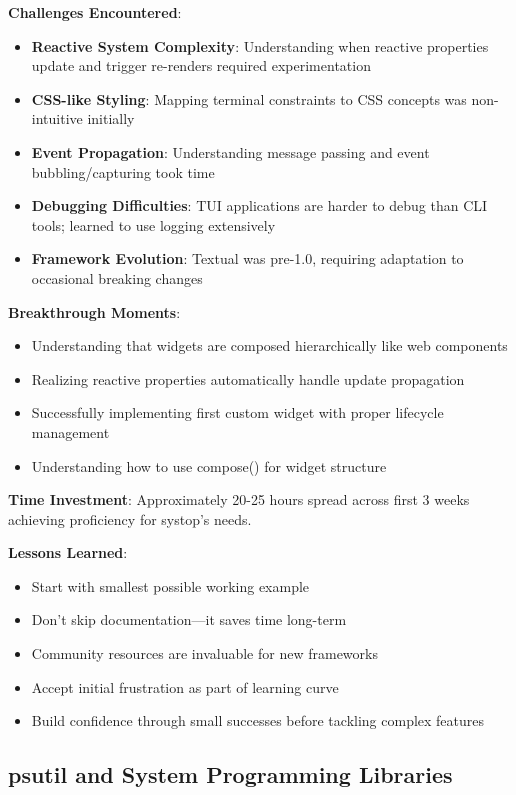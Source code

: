 \documentclass[12pt,a4paper,oneside]{report}
\begin{document}
\textbf{Challenges Encountered}:
\begin{itemize}
    \item \textbf{Reactive System Complexity}: Understanding when reactive properties update and trigger re-renders required experimentation
    \item \textbf{CSS-like Styling}: Mapping terminal constraints to CSS concepts was non-intuitive initially
    \item \textbf{Event Propagation}: Understanding message passing and event bubbling/capturing took time
    \item \textbf{Debugging Difficulties}: TUI applications are harder to debug than CLI tools; learned to use logging extensively
    \item \textbf{Framework Evolution}: Textual was pre-1.0, requiring adaptation to occasional breaking changes
\end{itemize}

\textbf{Breakthrough Moments}:
\begin{itemize}
    \item Understanding that widgets are composed hierarchically like web components
    \item Realizing reactive properties automatically handle update propagation
    \item Successfully implementing first custom widget with proper lifecycle management
    \item Understanding how to use compose() for widget structure
\end{itemize}

\textbf{Time Investment}: Approximately 20-25 hours spread across first 3 weeks achieving proficiency for systop's needs.

\textbf{Lessons Learned}:
\begin{itemize}
    \item Start with smallest possible working example
    \item Don't skip documentation---it saves time long-term
    \item Community resources are invaluable for new frameworks
    \item Accept initial frustration as part of learning curve
    \item Build confidence through small successes before tackling complex features
\end{itemize}

\subsection{psutil and System Programming Libraries}
\end{document}
